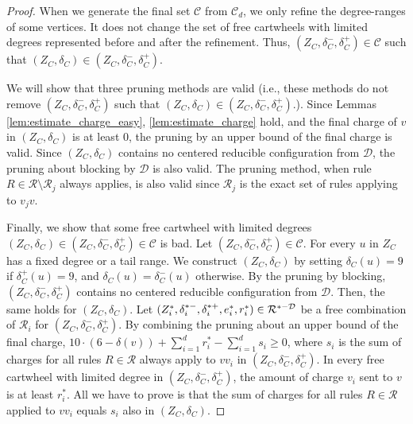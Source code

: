 \documentclass[10pt,a4paper]{article}
\begin{document}
\begin{proof}
    When we generate the final set $\mathcal{C}$ from $\mathcal{C}_d$, we only refine the degree-ranges of some vertices.
    It does not change the set of free cartwheels with limited degrees represented before and after the refinement.
    Thus, $(Z_C, \delta_C^-, \delta_C^+) \in \mathcal{C}$ such that $(Z_C, \delta_C) \in (Z_C, \delta_C^-, \delta_C^+)$.

    We will show that three pruning methods are valid (i.e., these methods do not remove $(Z_C, \delta_C^-, \delta_C^+)$ such that $(Z_C, \delta_C) \in (Z_C, \delta_C^-, \delta_C^+)$.).
    Since Lemmas \ref{lem:estimate_charge_easy}, \ref{lem:estimate_charge} hold, and the final charge of $v$ in $(Z_C, \delta_C)$ is at least 0, the pruning by an upper bound of the final charge is valid.
    Since $(Z_C, \delta_C)$ contains no centered reducible configuration from $\mathcal{D}$, the pruning about blocking by $\mathcal{D}$ is also valid.
    The pruning method, when rule $R \in \mathcal{R} \setminus \mathcal{R}_j$ always applies, is also valid since $\mathcal{R}_j$ is the exact set of rules applying to $v_jv$.

    Finally, we show that some free cartwheel with limited degrees $(Z_C, \delta_C) \in (Z_C, \delta_C^-, \delta_C^+) \in \mathcal{C}$ is bad.
    Let $(Z_C, \delta_C^-, \delta_C^+) \in \mathcal{C}$.
    For every $u$ in $Z_C$ has a fixed degree or a tail range.
    We construct $(Z_C, \delta_C)$ by setting $\delta_C(u)=9$ if $\delta_C^+(u)=9$, and $\delta_C(u)=\delta_C^-(u)$ otherwise.
    By the pruning by blocking, $(Z_C, \delta_C^-, \delta_C^+)$ contains no centered reducible configuration from $\mathcal{D}$.
    Then, the same holds for $(Z_C, \delta_C)$.
    Let $(Z_i^*, \delta_i^{*-}, \delta_i^{*+}, e_i^*, r_i^*) \in \mathcal{R}^{*-\mathcal{D}}$ be a free combination of $\mathcal{R}_i$ for $(Z_C, \delta_C^-, \delta_C^+)$.
    By combining the pruning about an upper bound of the final charge, $10 \cdot (6 - \delta(v)) + \sum_{i=1}^d r_i^* - \sum_{i=1}^d s_i \geq 0$, where $s_i$ is the sum of charges for all rules $R \in \mathcal{R}$ always apply to $vv_i$ in $(Z_C, \delta_C^-, \delta_C^+)$.
    In every free cartwheel with limited degree in $(Z_C, \delta_C^-, \delta_C^+)$, the amount of charge $v_i$ sent to $v$ is at least $r_i^*$.
    All we have to prove is that the sum of charges for all rules $R \in \mathcal{R}$ applied to $vv_i$ equals $s_i$ also in $(Z_C, \delta_C)$.


\end{proof}
\end{document}
